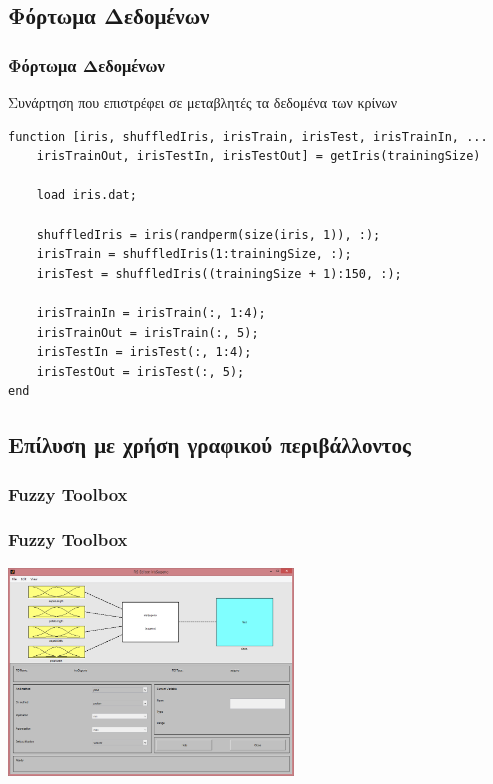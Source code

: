 \documentclass[xetex,serif,mathserif,14pt]{beamer}
\begin{document}

\subsection{Φόρτωμα Δεδομένων}

\begin{frame}[fragile]
\frametitle{Φόρτωμα Δεδομένων}
Συνάρτηση που επιστρέφει σε μεταβλητές τα δεδομένα των κρίνων
\begin{lstlisting}
function [iris, shuffledIris, irisTrain, irisTest, irisTrainIn, ...
    irisTrainOut, irisTestIn, irisTestOut] = getIris(trainingSize)

    load iris.dat;

    shuffledIris = iris(randperm(size(iris, 1)), :);
    irisTrain = shuffledIris(1:trainingSize, :);
    irisTest = shuffledIris((trainingSize + 1):150, :);

    irisTrainIn = irisTrain(:, 1:4);
    irisTrainOut = irisTrain(:, 5);
    irisTestIn = irisTest(:, 1:4);
    irisTestOut = irisTest(:, 5);
end
\end{lstlisting}
\end{frame}

\subsection{Επίλυση με χρήση γραφικού περιβάλλοντος}

\subsubsection{Fuzzy Toolbox}
\begin{frame}
\frametitle{Fuzzy Toolbox}
\centering
\includegraphics[height=5.5cm]{images/fuzzySugeno.png}
\end{frame}
\end{document}
